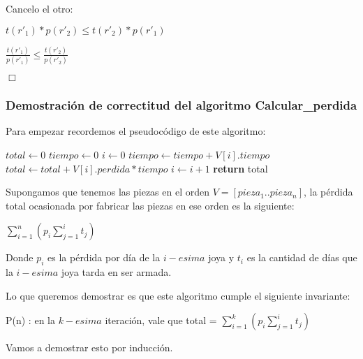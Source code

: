 Cancelo el otro:

$t(r'_1) * p(r'_2) \leq t(r'_2) * p(r'_1) $

$\frac{t(r'_1)}{p(r'_1)} \leq \frac{t(r'_2)}{p(r'_2)}$

\begin{flushright}
\hfill \ensuremath{\Box}
\end{flushright}

\subsubsection{Demostración de correctitud del algoritmo Calcular\_perdida}

Para empezar recordemos el pseudocódigo de este algoritmo:

\begin{pseudo}
      \State $total \leftarrow 0$
      \State $tiempo \leftarrow 0$
      \State $i \leftarrow 0$
	\State $tiempo \leftarrow tiempo + V[i].tiempo$
	\State $total \leftarrow total + V[i].perdida * tiempo$
	\State $i \leftarrow  i + 1$
      \EndWhile
      \State \textbf{return} total
  \EndProcedure
\end{pseudo}

Supongamos que tenemos las piezas en el orden $V = [pieza_1..pieza_n]$, la pérdida total ocasionada por fabricar las piezas en ese orden es la siguiente:

$\sum_{i=1}^{n}{(p_i \sum_{j=1}^{i}{t_j})}$

Donde $p_i$ es la pérdida por día de la $i-esima$ joya y $t_i$ es la cantidad de días que la $i-esima$ joya tarda en ser armada.

Lo que queremos demostrar es que este algoritmo cumple el siguiente invariante:

P(n) : en la $k-esima$ iteración, vale que total = $\sum_{i=1}^{k}{(p_i \sum_{j=1}^{i}{t_j})}$

Vamos a demostrar esto por inducción.

